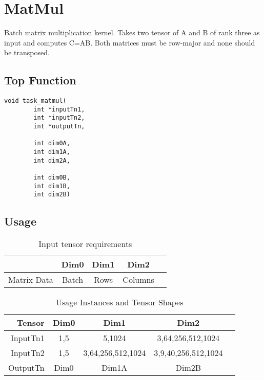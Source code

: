 \pagebreak












\section{MatMul}
Batch matrix multiplication kernel. Takes two tensor of A and B of rank three as input and computes C=AB. Both matrices must be row-major and none should be transposed.

\subsection{Top Function}
\begin{lstlisting}
void task_matmul(
		int *inputTn1,
		int *inputTn2,
		int *outputTn,

		int dim0A,
		int dim1A,
		int dim2A,

		int dim0B,
		int dim1B,
		int dim2B)
\end{lstlisting}

\subsection{Usage}

\begin{table}[htbp] %
\caption{Input tensor requirements}
\label{tab:shapes_concat}
	\begin{center}
		\begin{tabular}{|r|c|c|c|c|} 
		\hline	
		 & Dim0 & Dim1 & Dim2\\ 
		\hline	
		Matrix Data &
			Batch &
			Rows &
			Columns\\ 
		\hline 
		\end{tabular}
	\end{center}
\end{table}

\begin{table}[htbp] %
\caption{Usage Instances and Tensor Shapes}
\label{tab:shapes_concat}
	\begin{center}
		\begin{tabular}{|r|c|c|c|c|} 
		\hline	
		Tensor & Dim0 & Dim1 & Dim2\\ 
		\hline	
		InputTn1 &
			1,5 &
			5,1024 &
			3,64,256,512,1024\\ 
		\hline
		InputTn2 &
			1,5 &
			3,64,256,512,1024 &
			3,9,40,256,512,1024\\ 
		\hline
		OutputTn &
			Dim0 & 
			Dim1A & 
			Dim2B \\
		\hline
		\end{tabular}
	\end{center}
\end{table}


